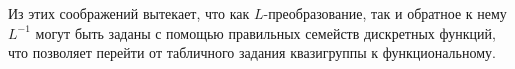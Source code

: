    Из этих соображений вытекает, что как $L$-преобразование, так и обратное к нему $L^{-1}$ могут быть заданы с помощью правильных семейств дискретных функций, что позволяет перейти от табличного задания квазигруппы к функциональному.









